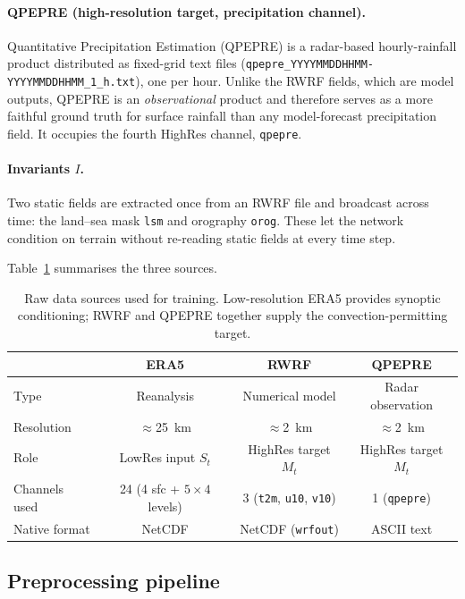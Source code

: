 \paragraph{QPEPRE (high-resolution target, precipitation channel).} Quantitative Precipitation Estimation (QPEPRE) is a radar-based hourly-rainfall product distributed as fixed-grid text files (\texttt{qpepre\_YYYYMMDDHHMM-YYYYMMDDHHMM\_1\_h.txt}), one per hour. Unlike the RWRF fields, which are model outputs, QPEPRE is an \emph{observational} product and therefore serves as a more faithful ground truth for surface rainfall than any model-forecast precipitation field. It occupies the fourth HighRes channel, \texttt{qpepre}.

\paragraph{Invariants $I$.} Two static fields are extracted once from an RWRF file and broadcast across time: the land--sea mask \texttt{lsm} and orography \texttt{orog}. These let the network condition on terrain without re-reading static fields at every time step.

Table~\ref{tab:data-sources} summarises the three sources.

\begin{table}[t]
\centering
\caption{Raw data sources used for training. Low-resolution ERA5 provides synoptic conditioning; RWRF and QPEPRE together supply the convection-permitting target.}
\label{tab:data-sources}
\begin{tabular}{lccc}
\toprule
 & \textbf{ERA5} & \textbf{RWRF} & \textbf{QPEPRE} \\
\midrule
Type & Reanalysis & Numerical model & Radar observation \\
Resolution & $\approx$\SI{25}{\kilo\metre} & $\approx$\SI{2}{\kilo\metre} & $\approx$\SI{2}{\kilo\metre} \\
Role & LowRes input $S_t$ & HighRes target $M_t$ & HighRes target $M_t$ \\
Channels used & 24 (4 sfc + $5\times4$ levels) & 3 (\texttt{t2m}, \texttt{u10}, \texttt{v10}) & 1 (\texttt{qpepre}) \\
Native format & NetCDF & NetCDF (\texttt{wrfout}) & ASCII text \\
\bottomrule
\end{tabular}
\end{table}

\subsection{Preprocessing pipeline}
\label{sec:method-datasources-pipeline}

